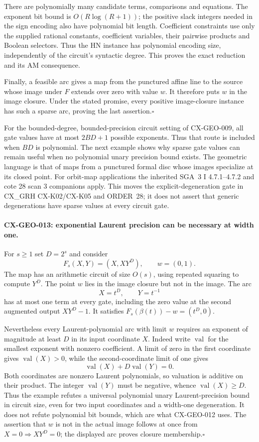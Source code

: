 There are polynomially many candidate terms, comparisons and equations.
The exponent bit bound is $O(R\log(R+1))$; the positive slack integers
needed in the sign encoding also have polynomial bit length. Coefficient
constraints use only the supplied rational constants, coefficient
variables, their pairwise products and Boolean selectors. Thus the HN
instance has polynomial encoding size, independently of the circuit's
syntactic degree. This proves the exact reduction and its AM consequence.

Finally, a feasible arc gives a map from the punctured affine line to
the source whose image under $F$ extends over zero with value $w$.
It therefore puts $w$ in the image closure. Under the stated promise,
every positive image-closure instance has such a sparse arc, proving the
last assertion.\hfill$\square$

For the bounded-degree, bounded-precision circuit setting of CX-GEO-009,
all gate values have at most $2BD+1$ possible exponents. Thus that route
is included when $BD$ is polynomial. The next example shows why sparse
gate values can remain useful when no polynomial unary precision bound
exists. The geometric language is that of maps from a punctured formal
disc whose images specialize at its closed point. For orbit-map
applications the inherited SGA~3 I 4.7.1--4.7.2 and cote 28 scan 3
companions apply. This moves the explicit-degeneration gate in
CX\_GRH CX-K02/CX-K05 and ORDER~28; it does not assert that generic
degenerations have sparse values at every circuit gate.

\paragraph{CX-GEO-013: exponential Laurent precision can be necessary at width one.}
For $s\ge1$ set $D=2^s$ and consider
\[
       F_s(X,Y)=(X,XY^D),\qquad w=(0,1).
\]
The map has an arithmetic circuit of size $O(s)$, using repeated
squaring to compute $Y^D$. The point $w$ lies in the image closure but
not in the image. The arc
\[
                         X=t^D,\qquad Y=t^{-1}
\]
has at most one term at every gate, including the zero value at the
second augmented output $XY^D-1$. It satisfies
$F_s(\beta(t))-w=(t^D,0)$.

Nevertheless every Laurent-polynomial arc with limit $w$ requires
an exponent of magnitude at least $D$ in its input coordinate $X$.
Indeed write $\operatorname{val}$ for the smallest exponent with
nonzero coefficient. A limit of zero in the first coordinate gives
$\operatorname{val}(X)>0$, while the second-coordinate limit of one
gives
\[
                \operatorname{val}(X)+D\operatorname{val}(Y)=0.
\]
Both coordinates are nonzero Laurent polynomials, so valuation is
additive on their product. The integer $\operatorname{val}(Y)$ must be
negative, whence $\operatorname{val}(X)\ge D$.
Thus the example refutes a universal polynomial unary Laurent-precision
bound in circuit size, even for two input coordinates and a width-one
degeneration. It does not refute polynomial bit bounds, which are what
CX-GEO-012 uses. The assertion that $w$ is not in the actual image
follows at once from $X=0\Rightarrow XY^D=0$; the displayed arc proves
closure membership.\hfill$\square$

